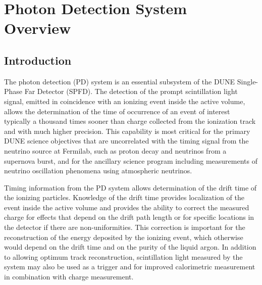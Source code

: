 \section{Photon Detection System Overview}
\label{sec:fdsp-pd-ov}


\subsection{Introduction}
\label{sec:fdsp-pd-intro}

The photon detection (PD) system is an essential subsystem of the DUNE Single-Phase Far Detector (SPFD). The detection of the prompt scintillation light signal, emitted in coincidence with an ionizing event inside the active volume, allows the determination of the time of occurrence of an event of interest typically a thousand times sooner than charge collected from the ionization track and with much higher precision. This capability is most critical for the primary DUNE science objectives that are uncorrelated with the timing signal from the neutrino source at Fermilab, such as proton decay and neutrinos from a supernova burst, and for the ancillary science program including measurements of neutrino oscillation phenomena using atmospheric neutrinos.

Timing information from the PD system allows determination of the drift time of the ionizing particles. Knowledge of the drift time provides localization of the event inside the active volume and provides the ability to correct the measured charge for effects that depend on the drift path length or for specific locations in the detector if there are non-uniformities.  This correction is important for the reconstruction of the energy deposited by the ionizing event, which otherwise would depend on the drift time and on the purity of the liquid argon. In addition to allowing optimum track reconstruction, scintillation light measured by the system may also be used as a trigger and for improved calorimetric measurement in combination with charge measurement.

